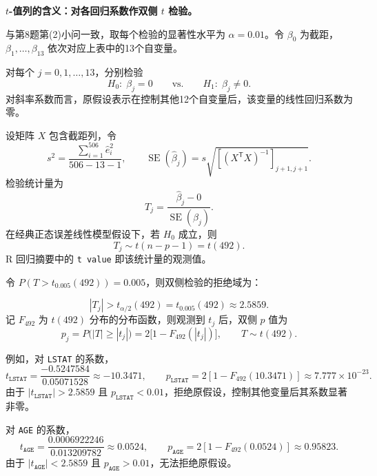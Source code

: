 \documentclass[12pt,a4paper]{article}
\begin{document}
\begin{answerbox}
\textbf{$t$-值列的含义：对各回归系数作双侧 $t$ 检验。}

与第8题第(2)小问一致，取每个检验的显著性水平为 $\alpha=0.01$。令 $\beta_0$ 为截距，$\beta_1,\ldots,\beta_{13}$ 依次对应上表中的13个自变量。

对每个 $j=0,1,\ldots,13$，分别检验
$$
H_0:\;\beta_j=0\qquad\text{vs.}\qquad H_1:\;\beta_j\neq0.
$$
对斜率系数而言，原假设表示在控制其他12个自变量后，该变量的线性回归系数为零。

设矩阵 $X$ 包含截距列，令
$$
s^2=\frac{\sum_{i=1}^{506}\hat e_i^2}{506-13-1},
\qquad
\operatorname{SE}(\hat\beta_j)
=s\sqrt{\left[(X^{\mathsf T}X)^{-1}\right]_{j+1,j+1}}.
$$
检验统计量为
$$
T_j=\frac{\hat\beta_j-0}{\operatorname{SE}(\hat\beta_j)}.
$$
在经典正态误差线性模型假设下，若 $H_0$ 成立，则
$$
T_j\sim t(n-p-1)=t(492).
$$
R 回归摘要中的 \texttt{t value} 即该统计量的观测值。

令 $P(T>t_{0.005}(492))=0.005$，则双侧检验的拒绝域为：

$$
|T_j|>t_{\alpha/2}(492)=t_{0.005}(492)\approx2.5859.
$$
记 $F_{492}$ 为 $t(492)$ 分布的分布函数，则观测到 $t_j$ 后，双侧 $p$ 值为
$$
p_j=P\bigl(|T|\ge|t_j|\bigr)
=2\bigl[1-F_{492}(|t_j|)\bigr],\qquad T\sim t(492).
$$

例如，对 \texttt{LSTAT} 的系数，
$$
t_{\texttt{LSTAT}}=\frac{-0.5247584}{0.05071528}\approx-10.3471,
\qquad
p_{\texttt{LSTAT}}=2[1-F_{492}(10.3471)]\approx7.777\times10^{-23}.
$$
由于 $|t_{\texttt{LSTAT}}|>2.5859$ 且 $p_{\texttt{LSTAT}}<0.01$，拒绝原假设，控制其他变量后其系数显著非零。

对 \texttt{AGE} 的系数，
$$
t_{\texttt{AGE}}=\frac{0.0006922246}{0.013209782}\approx0.0524,
\qquad
p_{\texttt{AGE}}=2[1-F_{492}(0.0524)]\approx0.95823.
$$
由于 $|t_{\texttt{AGE}}|<2.5859$ 且 $p_{\texttt{AGE}}>0.01$，无法拒绝原假设。


\end{answerbox}
\end{document}
